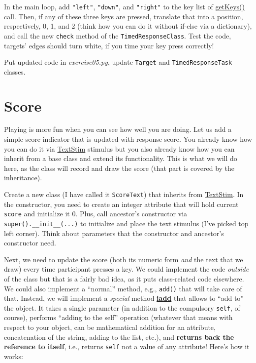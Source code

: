 \documentclass[
]{book}
\begin{document}
In the main loop, add \texttt{"left"}, \texttt{"down"}, and \texttt{"right"} to the key list of \href{https://psychopy.org/api/event.html\#psychopy.event.getKeys}{getKeys()} call. Then, if any of these three keys are pressed, translate that into a position, respectively, 0, 1, and 2 (think how you can do it without if-else via a dictionary), and call the new \texttt{check} method of the \texttt{TimedResponseClass}. Test the code, targets' edges should turn white, if you time your key press correctly!

Put updated code in \emph{exercise05.py}, update \texttt{Target} and \texttt{TimedResponseTask} classes.

\hypertarget{score}{%
\section{Score}\label{score}}

Playing is more fun when you can see how well you are doing. Let us add a simple score indicator that is updated with response score. You already know how you can do it via \href{https://psychopy.org/api/visual/textstim.html\#psychopy.visual.TextStim}{TextStim} stimulus but you also already know how you can inherit from a base class and extend its functionality. This is what we will do here, as the class will record and draw the score (that part is covered by the inheritance).

Create a new class (I have called it \texttt{ScoreText}) that inherits from \href{https://psychopy.org/api/visual/textstim.html\#psychopy.visual.TextStim}{TextStim}. In the constructor, you need to create an integer attribute that will hold current \texttt{score} and initialize it 0. Plus, call ancestor's constructor via \texttt{super().\_\_init\_\_(...)} to initialize and place the text stimulus (I've picked top left corner). Think about parameters that the constructor and ancestor's constructor need.

Next, we need to update the score (both its numeric form \emph{and} the text that we draw) every time participant presses a key. We could implement the code \emph{outside} of the class but that is a fairly bad idea, as it puts class-related code elsewhere. We could also implement a ``normal'' method, e.g., \texttt{add()} that will take care of that. Instead, we will implement a \emph{special} method \href{https://docs.python.org/3/reference/datamodel.html\#object.__iadd__}{\textbf{iadd}} that allows to ``add to'' the object. It takes a single parameter (in addition to the compulsory \texttt{self}, of course), performs ``adding to the self'' operation (whatever that means with respect to your object, can be mathematical addition for an attribute, concatenation of the string, adding to the list, etc.), and \textbf{returns back the reference to itself}, i.e., returns \texttt{self} not a value of any attribute! Here's how it works:
\end{document}
